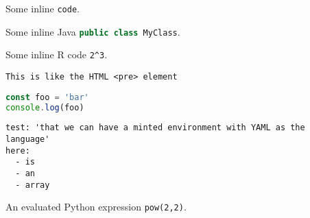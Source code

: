 %
%
%

Some inline \verb|code|.

Some inline Java \lstinline[language=Java]{public class MyClass}.

Some inline R code \texttt{2^3}.

\begin{verbatim}
This is like the HTML <pre> element
\end{verbatim}

\begin{lstlisting}[language=js]
const foo = 'bar'
console.log(foo)
\end{lstlisting}

\begin{verbatim}
test: 'that we can have a minted environment with YAML as the language'
here:
  - is
  - an
  - array
\end{verbatim}


An evaluated Python expression \lstinline[language=python exec]{pow(2,2)}.


